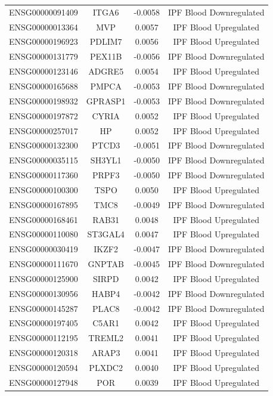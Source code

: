 \documentclass[
]{article}
\begin{document}
\begin{singlespace}
\begin{longtable}[t]{lccc}
ENSG00000091409 & ITGA6 & -0.0058 & IPF Blood Downregulated\\
ENSG00000013364 & MVP & 0.0057 & IPF Blood Upregulated\\
ENSG00000196923 & PDLIM7 & 0.0056 & IPF Blood Upregulated\\
ENSG00000131779 & PEX11B & -0.0056 & IPF Blood Downregulated\\
\addlinespace
ENSG00000123146 & ADGRE5 & 0.0054 & IPF Blood Upregulated\\
ENSG00000165688 & PMPCA & -0.0053 & IPF Blood Downregulated\\
ENSG00000198932 & GPRASP1 & -0.0053 & IPF Blood Downregulated\\
ENSG00000197872 & CYRIA & 0.0052 & IPF Blood Upregulated\\
ENSG00000257017 & HP & 0.0052 & IPF Blood Upregulated\\
\addlinespace
ENSG00000132300 & PTCD3 & -0.0051 & IPF Blood Downregulated\\
ENSG00000035115 & SH3YL1 & -0.0050 & IPF Blood Downregulated\\
ENSG00000117360 & PRPF3 & -0.0050 & IPF Blood Downregulated\\
ENSG00000100300 & TSPO & 0.0050 & IPF Blood Upregulated\\
ENSG00000167895 & TMC8 & -0.0049 & IPF Blood Downregulated\\
\addlinespace
ENSG00000168461 & RAB31 & 0.0048 & IPF Blood Upregulated\\
ENSG00000110080 & ST3GAL4 & 0.0047 & IPF Blood Upregulated\\
ENSG00000030419 & IKZF2 & -0.0047 & IPF Blood Downregulated\\
ENSG00000111670 & GNPTAB & -0.0045 & IPF Blood Downregulated\\
ENSG00000125900 & SIRPD & 0.0042 & IPF Blood Upregulated\\
\addlinespace
ENSG00000130956 & HABP4 & -0.0042 & IPF Blood Downregulated\\
ENSG00000145287 & PLAC8 & -0.0042 & IPF Blood Downregulated\\
ENSG00000197405 & C5AR1 & 0.0042 & IPF Blood Upregulated\\
ENSG00000112195 & TREML2 & 0.0041 & IPF Blood Upregulated\\
ENSG00000120318 & ARAP3 & 0.0041 & IPF Blood Upregulated\\
\addlinespace
ENSG00000120594 & PLXDC2 & 0.0040 & IPF Blood Upregulated\\
ENSG00000127948 & POR & 0.0039 & IPF Blood Upregulated\\

\end{longtable}
\end{singlespace}
\end{document}
